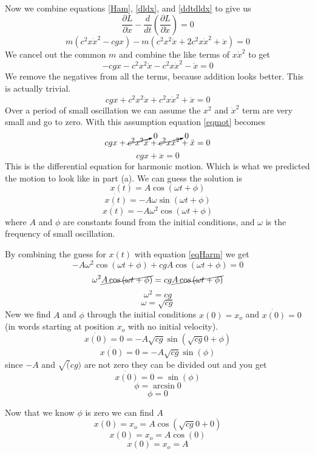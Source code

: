 \documentclass[11pt]{article}
\numberwithin{equation}{section}
\begin{document}
Now we combine equations \ref{Ham}, \ref{dldx}, and \ref{ddtdldx} to give us
$$\frac{\partial L}{\partial x} - \frac{d}{dt}\left(\frac{\partial L}{\partial \dot{x}}\right) = 0$$
$$m(c^2x\dot{x}^2 - cgx) - m(c^2x^2\ddot{x} + 2c^2x\dot{x}^2 + \ddot{x}) = 0$$
We cancel out the common $m$ and combine the like terms of $x\dot{x}^2$ to get
$$ - cgx - c^2x^2\ddot{x} - c^2x\dot{x}^2 - \ddot{x} = 0$$
We remove the negatives from all the terms, because addition looks better. This is actually trivial.
\begin{equation}
cgx + c^2x^2\ddot{x} + c^2x\dot{x}^2 + \ddot{x} = 0
\label{eqmot}
\end{equation}
Over a period of small oscillation we can assume the $x^2$ and $\dot{x}^2$ term are very small and go to zero. With this assumption equation \ref{eqmot} becomes
$$cgx + \cancelto{0}{c^2x^2\ddot{x}} + \cancelto{0}{c^2x\dot{x}^2} + \ddot{x} = 0$$
\begin{equation}
cgx + \ddot{x} = 0
\label{eqHarm}
\end{equation}
This is the differential equation for harmonic motion. Which is what we predicted the motion to look like in part (a). We can guess the solution is 
$$x(t) = A\cos{(\omega t + \phi)}$$
$$\dot{x(t)} =- A \omega \sin{(\omega t + \phi)}$$
$$\ddot{x(t)} =- A \omega^2 \cos{(\omega t + \phi)}$$
where $A$ and $\phi$ are constants found from the initial conditions, and $\omega$ is the frequency of small oscillation.

By combining the guess for $x(t)$ with equation \ref{eqHarm} we get
$$- A \omega^2 \cos{(\omega t + \phi)} +  cgA\cos{(\omega t + \phi)} = 0$$
$$\omega^2 \cancel{A\cos{(\omega t + \phi)}} = cg\cancel{A\cos{(\omega t + \phi)}}$$
$$\omega^2 = cg$$
\begin{equation}
\omega = \sqrt{cg}
\label{omega}
\end{equation}
New we find $A$ and $\phi$ through the initial conditions $x(0) = x_o$ and $\dot{x(0)} = 0$ (in words starting at position $x_o$ with no initial velocity).
$$\dot{x(0)} = 0 =- A \sqrt{cg} \sin{(\sqrt{cg} 0 + \phi)}$$
$$\dot{x(0)} = 0 =- A \sqrt{cg} \sin{(\phi)}$$
since $-A$ and $\sqrt(cg)$ are not zero they can be divided out and you get
$$\dot{x(0)} = 0 =\sin{(\phi)}$$
$$\phi = \arcsin{0}$$
$$\phi = 0$$

Now that we know $\phi$ is zero we can find $A$
$$x(0) = x_o = A\cos{(\sqrt{cg} 0 + 0)}$$
$$x(0) = x_o = A\cos{(0)}$$
$$x(0) = x_o = A$$
\end{document}

